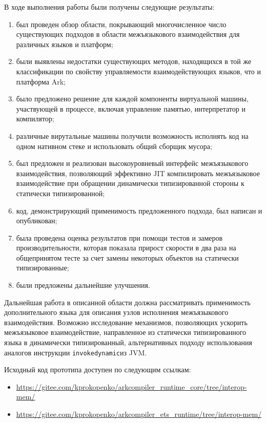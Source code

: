 \documentclass[times
]{itmo-student-thesis}
\def\Indy{\texttt{invokedynamic}}
\begin{document}
\startconclusionpage
В ходе выполнения работы были получены следующие результаты:
\begin{enumerate}
	\item был проведен обзор области, покрывающий многочисленное число существующих подходов в области межъязыкового взаимодействия для различных языков и платформ;
	\item были выявлены недостатки существующих методов, находящихся в той же классификации по свойству управляемости взаимодействующих языков, что и платформа Ark;
	\item было предложено решение для каждой компоненты виртуальной машины, участвующей в процессе, включая управление памятью, интерпретатор и компилятор;
	\item различные вирутальные машины получили возможность исполнять код на одном нативном стеке и использовать общий сборщик мусора;
	\item был предложен и реализован высокоуровневый интерфейс межъязыкового взаимодействия, позволяющий эффективно JIT компилировать межъязыковое взаимодействие при обращении динамически типизированной стороны к статически типизированной;
	\item код, демонстрирующий применимость предложенного подхода, был написан и опубликован;
	\item была проведена оценка результатов при помощи тестов и замеров производительности, которая показала прирост скорости в два раза на общепринятом тесте за счет замены некоторых объектов на статически типизированные;
	\item были предложены дальнейшие улучшения.
\end{enumerate}

Дальнейшая работа в описанной области должна рассматривать применимость дополнительного языка для описания узлов исполнения межъязыкового взаимодействия. Возможно исследование механизмов, позволяющих ускорить межъязыковое взаимодействие, направленное из статически типизированного языка в динамически типизированный, альтернативных подходу использования аналогов инструкции \Indy из JVM.

Исходный код прототипа доступен по следующим ссылкам:
\begin{itemize}
	\item \url{https://gitee.com/kprokopenko/arkcompiler_runtime_core/tree/interop-mem/}
	\item \url{https://gitee.com/kprokopenko/arkcompiler_ets_runtime/tree/interop-mem/}
\end{itemize}
\end{document}
